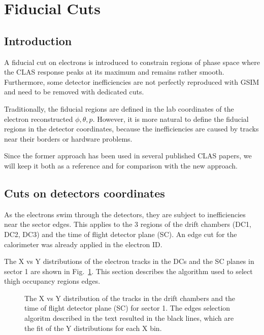 \section{Fiducial Cuts}

\subsection{Introduction}

A fiducial cut on electrons is introduced to constrain regions of phase space
where the CLAS response peaks at its maximum and remains rather smooth.
Furthermore, some detector inefficiencies are not perfectly reproduced with GSIM and need to be
removed with dedicated cuts.

Traditionally, the fiducial regions are defined in the lab coordinates of the electron reconstructed $\phi, \theta, p$.
However, it is more natural to define the fiducial regions in the detector coordinates, because
the inefficiencies are caused by tracks near their borders or hardware problems.

Since the former approach has been used in several published CLAS papers, we will keep it both as a reference
and for comparison with the new approach.







\subsection{Cuts on detectors coordinates}

As the electrons swim through the detectors, they are subject to inefficiencies near the sector edges.
This applies to the 3 regions of the drift chambers (DC1, DC2, DC3) and the time of flight detector plane (SC).
An edge cut for the calorimeter was already applied in the electron ID.

\newpage

The X vs Y distributions of the electron tracks in the DCs and the SC planes in sector 1 are shown in Fig.~\ref{fig:xy_all_planes_s1}.
This section describes the algorithm used to select thigh occupancy regions edges.

\begin{figure}[h]
    \centering
    \caption{The X vs Y distribution of the tracks in the drift chambers and the time
    of flight detector plane (SC) for sector 1. The edges selection algoritm described in the text resulted
    in the black lines, which are the fit of the Y distributions for each X bin.}
    \label{fig:xy_all_planes_s1}
\end{figure}

